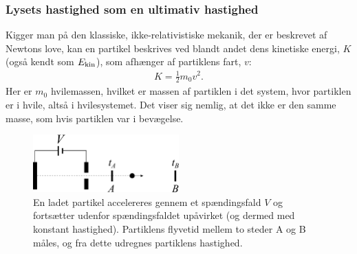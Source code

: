\subsubsection{Lysets hastighed som en ultimativ hastighed}

Kigger man på den klassiske, ikke-relativistiske mekanik, der er beskrevet af Newtons love, kan en partikel beskrives ved blandt andet dens kinetiske energi, $K$ (også kendt som $E_{\textup{kin}}$), som afhænger af partiklens fart, $v$:
%
\begin{align} \label{rel:eq:KineticEnergy}
    K = \frac{1}{2}m_0v^2.
\end{align}
%
Her er $m_0$ hvilemassen, hvilket er massen af partiklen i det system, hvor partiklen er i hvile, altså i hvilesystemet. Det viser sig nemlig, at det ikke er den samme masse, som hvis partiklen var i bevægelse.

\begin{figure}[t]
    \centering
    \includegraphics[width=0.5\textwidth]{Rel/RelLorent/EksperimentalSetupElectronVelocity.pdf}
    \caption{En ladet partikel accelereres gennem et spændingsfald $V$ og fortsætter udenfor spændingsfaldet upåvirket (og dermed med konstant hastighed). Partiklens flyvetid mellem to steder A og B måles, og fra dette udregnes partiklens hastighed.}
    \label{fig:ExperimentElectronVelocity}
\end{figure}

